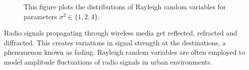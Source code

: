 \begin{figure}[ht]
\begin{center}
\end{center}
\caption{This figure plots the distributions of Rayleigh random variables for parameters $\sigma^2 \in \{ 1, 2, 4 \}$.}
\end{figure}

\begin{example}
Radio signals propagating through wireless media get reflected, refracted and diffracted.
This creates variations in signal strength at the destinations, a phenomenon known as fading.
Rayleigh random variables are often employed to model amplitude fluctuations of radio signals in urban environments.
\end{example}

